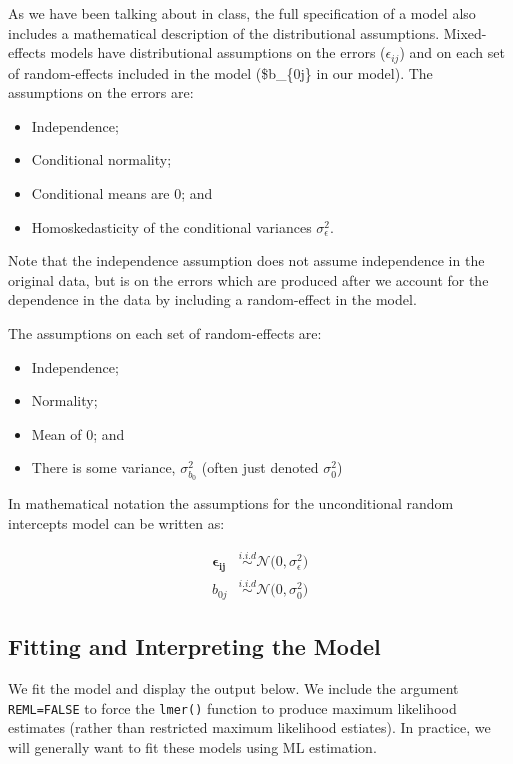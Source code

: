 \documentclass[]{book}
\providecommand{\tightlist}{%
  \setlength{\itemsep}{0pt}\setlength{\parskip}{0pt}}
\begin{document}
As we have been talking about in class, the full specification of a model also includes a mathematical description of the distributional assumptions. Mixed-effects models have distributional assumptions on the errors (\(\epsilon_{ij}\)) and on each set of random-effects included in the model (\$b\_\{0j\} in our model). The assumptions on the errors are:

\begin{itemize}
\tightlist
\item
  Independence;
\item
  Conditional normality;
\item
  Conditional means are 0; and
\item
  Homoskedasticity of the conditional variances \(\sigma^2_{\epsilon}\).
\end{itemize}

Note that the independence assumption does not assume independence in the original data, but is on the errors which are produced after we account for the dependence in the data by including a random-effect in the model.

The assumptions on each set of random-effects are:

\begin{itemize}
\tightlist
\item
  Independence;
\item
  Normality;
\item
  Mean of 0; and
\item
  There is some variance, \(\sigma^2_{b_0}\) (often just denoted \(\sigma^2_0\))
\end{itemize}

In mathematical notation the assumptions for the unconditional random intercepts model can be written as:

\[
\begin{split}
\boldsymbol{\epsilon_{ij}} &\overset{i.i.d}{\sim} \mathcal{N}\big( 0, \sigma^2_{\epsilon}\big) \\[1em]
b_{0j} &\overset{i.i.d}{\sim} \mathcal{N}\big(0, \sigma^2_0  \big)
\end{split}
\]

\hypertarget{fitting-and-interpreting-the-model}{%
\subsection{Fitting and Interpreting the Model}\label{fitting-and-interpreting-the-model}}

We fit the model and display the output below. We include the argument \texttt{REML=FALSE} to force the \texttt{lmer()} function to produce maximum likelihood estimates (rather than restricted maximum likelihood estiates). In practice, we will generally want to fit these models using ML estimation.
\end{document}
